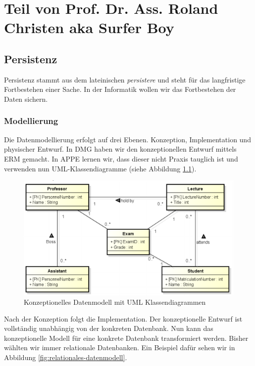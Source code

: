 \chapter{Teil von Prof. Dr. Ass. Roland Christen aka Surfer Boy}

\section{Persistenz}
Persistenz stammt aus dem lateinischen \emph{persistere} und steht für das langfristige Fortbestehen einer Sache. In der Informatik wollen wir das Fortbestehen der Daten sichern.

\subsection{Modellierung}
Die Datenmodellierung erfolgt auf drei Ebenen. Konzeption, Implementation und physischer Entwurf. In DMG haben wir den konzeptionellen Entwurf mittels ERM gemacht. In APPE lernen wir, dass dieser nicht Praxis tauglich ist und verwenden nun UML-Klassendiagramme (siehe Abbildung \ref{fig:konzeptionelles-datenmodell-mit-klassendiagram}).

\begin{figure}[h!]
\centering
\includegraphics[width=0.7\linewidth]{fig/konzeptionelles-datenmodell-mit-klassendiagram}
\caption{Konzeptionelles Datenmodell mit UML Klassendiagrammen}
\label{fig:konzeptionelles-datenmodell-mit-klassendiagram}
\end{figure}

Nach der Konzeption folgt die Implementation. Der konzeptionelle Entwurf ist vollständig unabhängig von der konkreten Datenbank. Nun kann das konzeptionelle Modell für eine konkrete Datenbank transformiert werden. Bisher wählten wir immer relationale Datenbanken.
Ein Beispiel dafür sehen wir in Abbildung \ref{fig:relationales-datenmodell}.

